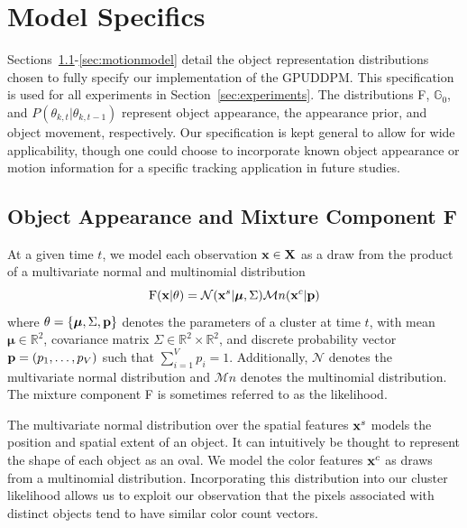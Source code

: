 \documentclass[twocolumn, final]{svjour3}
\begin{document}

\section{Model Specifics}
\label{sec:modelspecification}

Sections~\ref{sec:objectappearance}-\ref{sec:motionmodel} detail the object representation distributions chosen to fully specify our implementation of the GPUDDPM. This specification is used for all experiments in Section~\ref{sec:experiments}. The distributions F, $\mathbb{G}_{0}$, and $P(\theta_{k, t} | \theta_{k, t-1})$ represent object appearance, the appearance prior, and object movement, respectively. Our specification is kept general to allow for wide applicability, though one could choose to incorporate known object appearance or motion information for a specific tracking application in future studies.


\subsection{Object Appearance and Mixture Component F}
\label{sec:objectappearance}

At a given time $t$, we model each observation $\bold{x} \in \bold{X}$ as a draw from the product of a multivariate normal and multinomial distribution
\begin{equation}
\label{likelihood}
\text{F}(\bold{x}|\theta) = \mathcal{N}(\bold{x}^{s} | \boldsymbol{\mu}, \Sigma)  \mathcal{M}n(\bold{x}^{c} | \bold{p})
\end{equation}
where $\theta = \{ \boldsymbol{\mu}, \Sigma, \bold{p} \}$ denotes the parameters of a cluster at time $t$, with mean $\boldsymbol{\mu} \in \mathbb{R}^{2}$, covariance matrix $\Sigma \in \mathbb{R}^{2} \times \mathbb{R}^{2}$, and discrete probability vector $\bold{p} = (p_{1}, \ldots, p_{V})$ such that $\sum_{i=1}^{V}p_{i} = 1$. Additionally, $\mathcal{N}$ denotes the multivariate normal distribution and $\mathcal{M}n$ denotes the multinomial distribution. The mixture component F is sometimes referred to as the likelihood.

The multivariate normal distribution over the spatial features $\bold{x}^{s}$ models the position and spatial extent of an object. It can intuitively be thought to represent the shape of each object as an oval. We model the color features $\bold{x}^{c}$ as draws from a multinomial distribution. Incorporating this distribution into our cluster likelihood allows us to exploit our observation that the pixels associated with distinct objects tend to have similar color count vectors.
\end{document}
